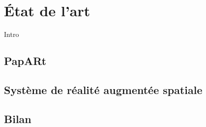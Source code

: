 \chapter{État de l'art}

Intro

\section{PapARt}

\section{Système de réalité augmentée spatiale}

\section{Bilan}